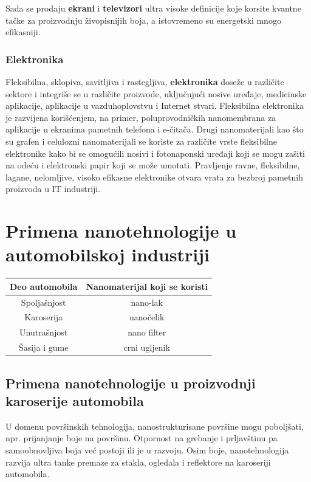 \documentclass[a4paper]{article}
\begin{document}
{Sada se prodaju \textbf{ekrani} i \textbf{televizori} ultra visoke definicije koje korsite kvantne tačke za proizvodnju živopisnijih boja, a istovremeno su energetski mnogo efikasniji.\\

\subsubsection{Elektronika}
Fleksibilna, sklopiva, savitljiva i rastegljiva, \textbf{elektronika} doseže u različite sektore i integriše se u različite proizvode, uključujući nosive uređaje, medicinske aplikacije, aplikacije u vazduhoplovstvu i Internet stvari. Fleksibilna elektronika je razvijena korišćenjem, na primer, poluprovodničkih nanomembrana za aplikacije u ekranima pametnih telefona i e-čitača. Drugi nanomaterijali kao što su grafen i celulozni nanomaterijali se koriste za različite vrste fleksibilne elektronike kako bi se omogućili nosivi i  fotonaponski uređaji koji se mogu zašiti na odeću i elektronski papir koji se može umotati. Pravljenje ravne, fleksibilne, lagane, nelomljive, visoko efikasne elektronike otvara vrata za bezbroj pametnih proizvoda u IT industriji.

\section{Primena nanotehnologije u automobilskoj industriji}

\begin{table}[h!]
\begin{center}
\begin{tabular}{|c|c|}
\hline
Deo automobila & Nanomaterijal koji se koristi \\
\hline
Spoljašnjost & nano-lak \\
\hline
Karoserija & nanočelik \\
\hline
Unutrašnjost & nano filter \\
\hline
Šasija i gume & crni ugljenik \\
\hline
\end{tabular}
\end{center}
\end{table}

\subsection{Primena nanotehnologije u proizvodnji karoserije automobila}

U domenu površinskih tehnologija, nanostrukturisane površine mogu poboljšati, npr. prijanjanje boje na površinu. Otpornost na grebanje i prljavštinu pa samoobnovljiva boja već postoji ili je u razvoju. Osim boje, nanotehnologija razvija ultra tanke premaze za stakla, ogledala i reflektore na karoseriji automobila.\\

}
\end{document}
